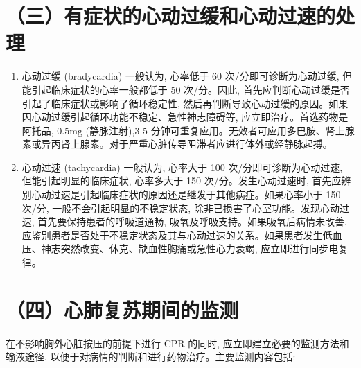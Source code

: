 \documentclass[10pt]{article}
\begin{document}
\section*{（三）有症状的心动过缓和心动过速的处理}
\begin{enumerate}
  \item 心动过缓 (bradycardia) 一般认为, 心率低于 60 次/分即可诊断为心动过缓, 但能引起临床症状的心率一般都低于 50 次/分。因此, 首先应判断心动过缓是否引起了临床症状或影响了循环稳定性, 然后再判断导致心动过缓的原因。如果因心动过缓引起循环功能不稳定、急性神志障碍等, 应立即治疗。首选药物是阿托品, $0.5 \mathrm{mg}$ (静脉注射),3 5 分钟可重复应用。无效者可应用多巴胺、肾上腺素或异丙肾上腺素。对于严重心脏传导阻滞者应进行体外或经静脉起搏。

  \item 心动过速 (tachycardia) 一般认为, 心率大于 100 次/分即可诊断为心动过速, 但能引起明显的临床症状, 心率多大于 150 次/分。发生心动过速时, 首先应辨别心动过速是引起临床症状的原因还是继发于其他病症。如果心率小于 150 次/分, 一般不会引起明显的不稳定状态, 除非已损害了心室功能。发现心动过速, 首先要保持患者的呼吸道通畅, 吸氧及呼吸支持。如果吸氧后病情未改善, 应鉴别患者是否处于不稳定状态及其与心动过速的关系。如果患者发生低血压、神志突然改变、休克、缺血性胸痛或急性心力衰竭, 应立即进行同步电复律。

\end{enumerate}

\section*{（四）心肺复苏期间的监测}
在不影响胸外心脏按压的前提下进行 CPR 的同时, 应立即建立必要的监测方法和输液途径, 以便于对病情的判断和进行药物治疗。主要监测内容包括:
\end{document}
